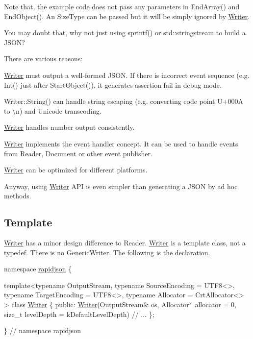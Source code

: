 Note that, the example code does not pass any parameters in {\ttfamily End\+Array()} and {\ttfamily End\+Object()}. An {\ttfamily Size\+Type} can be passed but it will be simply ignored by {\ttfamily \hyperlink{class_writer}{Writer}}.

You may doubt that, why not just using {\ttfamily sprintf()} or {\ttfamily std\+::stringstream} to build a J\+S\+ON?

There are various reasons\+:
\begin{DoxyEnumerate}
\item {\ttfamily \hyperlink{class_writer}{Writer}} must output a well-\/formed J\+S\+ON. If there is incorrect event sequence (e.\+g. {\ttfamily Int()} just after {\ttfamily Start\+Object()}), it generates assertion fail in debug mode.
\item {\ttfamily Writer\+::\+String()} can handle string escaping (e.\+g. converting code point {\ttfamily U+000A} to {\ttfamily \textbackslash{}n}) and Unicode transcoding.
\item {\ttfamily \hyperlink{class_writer}{Writer}} handles number output consistently.
\item {\ttfamily \hyperlink{class_writer}{Writer}} implements the event handler concept. It can be used to handle events from {\ttfamily Reader}, {\ttfamily Document} or other event publisher.
\item {\ttfamily \hyperlink{class_writer}{Writer}} can be optimized for different platforms.
\end{DoxyEnumerate}

Anyway, using {\ttfamily \hyperlink{class_writer}{Writer}} A\+PI is even simpler than generating a J\+S\+ON by ad hoc methods.\hypertarget{md_Commun_Externe_RapidJSON_doc_sax.zh-cn_WriterTemplate}{}\subsection{Template}\label{md_Commun_Externe_RapidJSON_doc_sax.zh-cn_WriterTemplate}
{\ttfamily \hyperlink{class_writer}{Writer}} has a minor design difference to {\ttfamily Reader}. {\ttfamily \hyperlink{class_writer}{Writer}} is a template class, not a typedef. There is no {\ttfamily Generic\+Writer}. The following is the declaration.


\begin{DoxyCode}
\textcolor{keyword}{namespace }\hyperlink{namespacerapidjson}{rapidjson} \{

\textcolor{keyword}{template}<\textcolor{keyword}{typename} OutputStream, \textcolor{keyword}{typename} SourceEncoding = UTF8<>, \textcolor{keyword}{typename} TargetEncoding = UTF8<>, \textcolor{keyword}{
      typename} Allocator = CrtAllocator<> >
\textcolor{keyword}{class }\hyperlink{class_writer}{Writer} \{
\textcolor{keyword}{public}:
    \hyperlink{class_writer}{Writer}(OutputStream& os, Allocator* allocator = 0, \textcolor{keywordtype}{size\_t} levelDepth = kDefaultLevelDepth)
\textcolor{comment}{// ...}
\};

\} \textcolor{comment}{// namespace rapidjson}
\end{DoxyCode}



